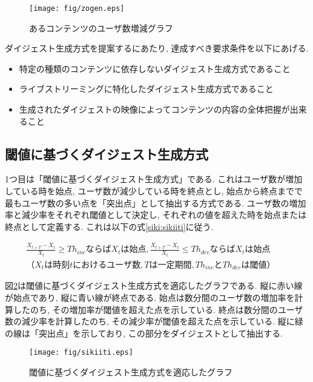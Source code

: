 \begin{figure}[h]
  \centering
  \texttt{[image: fig/zogen.eps]}
  \caption{あるコンテンツのユーザ数増減グラフ}
  \label{fig:zogen}
\end{figure}

ダイジェスト生成方式を提案するにあたり, 達成すべき要求条件を以下にあげる.

\begin{itemize}
\item 特定の種類のコンテンツに依存しないダイジェスト生成方式であること
\item ライブストリーミングに特化したダイジェスト生成方式であること
\item 生成されたダイジェストの映像によってコンテンツの内容の全体把握が出来ること
\end{itemize}

\newpage

\subsection{閾値に基づくダイジェスト生成方式}
1つ目は「閾値に基づくダイジェスト生成方式」である. これはユーザ数が増加している時を始点, ユーザ数が減少している時を終点とし, 始点から終点までで最もユーザ数の多い点を「突出点」として抽出する方式である. ユーザ数の増加率と減少率をそれぞれ閾値として決定し, それぞれの値を超えた時を始点または終点として定義する. これは以下の式\ref{siki:sikiiti}に従う.

\begin{eqnarray}
\frac{X_{t+T}-X_{t}}{X_{t}} \geq Th_{inc}ならばX_{t}は始点, \frac{X_{t+T}-X_{t}}{X_{t}} \leq Th_{dec}ならばX_{t}は始点 \nonumber \\
（X_{t}は時刻tにおけるユーザ数,Tは一定期間, Th_{inc}とTh_{dec}は閾値）&&
\label{siki:sikiiti}
\end{eqnarray}

図\ref{fig:sikiiti}は閾値に基づくダイジェスト生成方式を適応したグラフである. 縦に赤い線が始点であり, 縦に青い線が終点である. 始点は数分間のユーザ数の増加率を計算したのち, その増加率が閾値を超えた点を示している. 終点は数分間のユーザ数の減少率を計算したのち, その減少率が閾値を超えた点を示している. 縦に緑の線は「突出点」を示しており, この部分をダイジェストとして抽出する.

\begin{figure}[h]
  \centering
  \texttt{[image: fig/sikiiti.eps]}
  \caption{閾値に基づくダイジェスト生成方式を適応したグラフ}
  \label{fig:sikiiti}
\end{figure}

